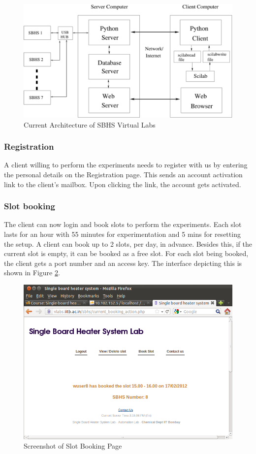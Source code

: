\begin{figure}
\centering
\includegraphics[width=\linewidth]{IEEE-Chile/figures/blk-dig.pdf}
\caption{Current Architecture of SBHS Virtual Labs}
\label{fig:detail-arch}
\end{figure}



\subsubsection{Registration}
A client willing to perform the experiments needs to register with us
by entering the personal details on the Registration page. This sends
an account activation link to the client’s mailbox. Upon clicking the
link, the account gets activated.
\subsubsection {Slot booking} The client can now login and book slots
to perform the experiments. Each slot lasts for an hour with 55
minutes for experimentation and 5 mins for resetting the setup. A
client can book up to 2 slots, per day, in advance. Besides this, if
the current slot is empty, it can be booked as a free slot. For each
slot being booked, the client gets a port number and an access
key. The interface depicting this is shown in Figure
\ref{fig:slot-booking}.
\begin{figure}
\includegraphics[width=\linewidth]{IEEE-Chile/figures/slot-book.png}
\caption{Screenshot of Slot Booking Page}
\label{fig:slot-booking}
\end{figure}
